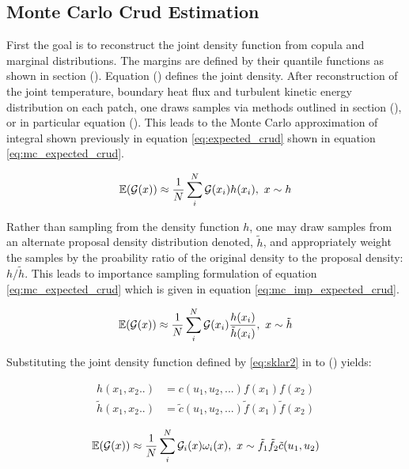 

\subsection{Monte Carlo Crud Estimation}
\label{chap:mc_crud}

First the goal is to reconstruct the joint density function from copula and marginal distributions.  The margins are defined by their quantile functions as shown in section ().  Equation () defines the joint density. After reconstruction of the joint temperature, boundary heat flux and turbulent kinetic energy distribution on each patch, one draws samples via methods outlined in section (), or in particular equation ().  This leads to the Monte Carlo approximation of integral shown previously in equation \ref{eq:expected_crud} shown in equation \ref{eq:mc_expected_crud}.

\begin{equation}
\operatorname*{\mathbb{E}}(\mathcal G(x)) \approx \frac{1}{N} \sum_i^N \mathcal G(x_i) h(x_i), \ x \sim {h}
\label{eq:mc_expected_crud}
\end{equation}

Rather than sampling from the density function $h$, one may draw samples from an alternate proposal density distribution denoted, $\tilde h$, and appropriately weight the samples by the proability ratio of the original density to the proposal density: $h/\tilde h$.  This leads to importance sampling formulation of equation \ref{eq:mc_expected_crud} which is given in equation \ref{eq:mc_imp_expected_crud}.

\begin{equation}
\operatorname*{\mathbb{E}}(\mathcal G(x)) \approx \frac{1}{N} \sum_i^N \mathcal G(x_i) \frac{h(x_i)}{\tilde h(x_i)}, \ x \sim \tilde{h}
\label{eq:mc_imp_expected_crud}
\end{equation}

Substituting the joint density function defined by \ref{eq:sklar2} in to () yields:

\begin{align}
    h(x_1, x_2..) &= c(u_1, u_2, ...) f(x_1) f(x_2) \nonumber \\
    \tilde h(x_1, x_2..) &= \tilde c(u_1, u_2, ...) \tilde f(x_1) \tilde f(x_2)
\label{eq:mc_imp_int_2}
\end{align}

\begin{equation}
\operatorname*{\mathbb{E}}(\mathcal G(x)) \approx \frac{1}{N} \sum_i^N \mathcal G_i(x) \omega_i(x), \ x \sim \tilde{f_1} \tilde f_2 \tilde c(u_1, u_2)
\label{eq:mc_imp_int2}
\end{equation}

